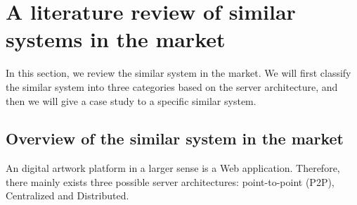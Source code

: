 \section{A literature review of similar systems in the market}


In this section, we review the similar system in the market. We will first classify the similar system into three categories based on the server architecture, and then we will give a case study to a specific similar system.

\subsection{Overview of the similar system in the market}
An digital artwork platform in a larger sense is a Web application. Therefore, there mainly exists three possible server architectures: point-to-point (P2P), Centralized and Distributed.
